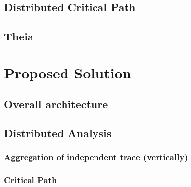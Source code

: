 \subsection{Distributed Critical Path}

\subsection{Theia}

\section{Proposed Solution}
\subsection{Overall architecture}
\subsection{}

\subsection{Distributed Analysis}

\subsubsection{Aggregation of independent trace (vertically)}

\subsubsection{Critical Path}

